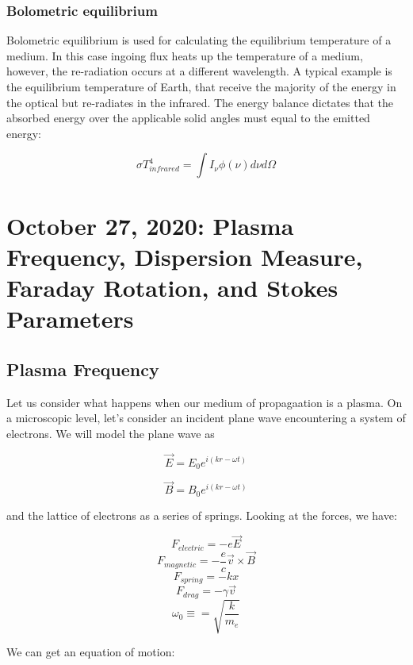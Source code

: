 \documentclass{article}
\def\Bfield{{\vec{B}}}
\def\Efield{{\vec {E}}}
\begin{document}
\subsubsection{Bolometric equilibrium} 
Bolometric equilibrium is used for calculating the equilibrium temperature of a medium. In this case ingoing flux heats up the temperature of a medium, however, the re-radiation occurs at a different wavelength. A typical example is the equilibrium temperature of Earth, that receive the majority of the energy in the optical but re-radiates in the infrared. The energy balance dictates that the absorbed energy over the applicable solid angles must equal to the emitted energy:  



\begin{equation} 
\sigma T_{infrared}^4 = \int I_\nu \phi(\nu) d\nu d\Omega
\end{equation} 


\newpage
\section{October 27, 2020: Plasma Frequency, Dispersion Measure, Faraday Rotation, and Stokes Parameters}

\subsection{Plasma Frequency}

Let us consider what happens when our medium of propagaation is a plasma. On a microscopic level, let's consider an incident plane wave encountering a system of electrons. We will model the plane wave as

$$
\Efield = E_0 e^{i\left(kr - \omega t\right)}
$$


$$
\Bfield = B_0 e^{i\left(kr - \omega t\right)}
$$

and the lattice of electrons as a series of springs. Looking at the forces, we have:

$$
F_{electric} = -e \Efield
$$
$$
F_{magnetic} = -\frac{e}{c} \vec{v} \times \Bfield
$$
$$
F_{spring} = -k x
$$
$$
F_{drag} = -\gamma \vec{v}
$$
$$
\omega_0 \equiv = \sqrt{\frac{k}{m_e}}
$$

We can get an equation of motion:
\end{document}
